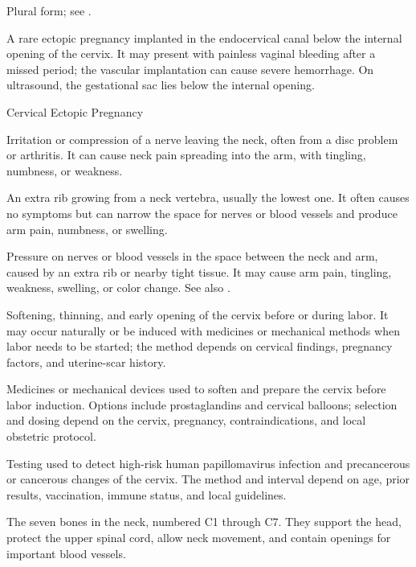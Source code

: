  Plural form; see .

 A rare ectopic pregnancy implanted in the endocervical canal below the internal opening of the cervix. It may present with painless vaginal bleeding after a missed period; the vascular implantation can cause severe hemorrhage. On ultrasound, the gestational sac lies below the internal opening.

\synonyms
Cervical Ectopic Pregnancy

 Irritation or compression of a nerve leaving the neck, often from a disc problem or arthritis. It can cause neck pain spreading into the arm, with tingling, numbness, or weakness.

 An extra rib growing from a neck vertebra, usually the lowest one. It often causes no symptoms but can narrow the space for nerves or blood vessels and produce arm pain, numbness, or swelling.

 Pressure on nerves or blood vessels in the space between the neck and arm, caused by an extra rib or nearby tight tissue. It may cause arm pain, tingling, weakness, swelling, or color change. See also .

 Softening, thinning, and early opening of the cervix before or during labor. It may occur naturally or be induced with medicines or mechanical methods when labor needs to be started; the method depends on cervical findings, pregnancy factors, and uterine-scar history.

 Medicines or mechanical devices used to soften and prepare the cervix before labor
induction. Options include prostaglandins and cervical balloons; selection and dosing depend on the cervix, pregnancy,
contraindications, and local obstetric protocol.

 Testing used to detect high-risk human papillomavirus infection and precancerous or cancerous changes of the cervix. The method and interval depend on age, prior results, vaccination, immune status, and local guidelines.

 The seven bones in the neck, numbered C1 through C7. They support the head, protect the upper spinal cord, allow neck movement, and contain openings for important blood vessels.

